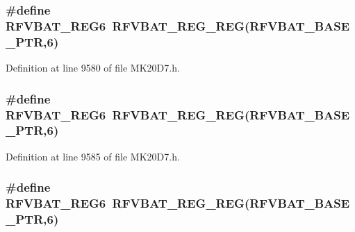 \subsubsection[{\texorpdfstring{R\+F\+V\+B\+A\+T\+\_\+\+R\+E\+G6}{RFVBAT_REG6}}]{\setlength{\rightskip}{0pt plus 5cm}\#define R\+F\+V\+B\+A\+T\+\_\+\+R\+E\+G6~{\bf R\+F\+V\+B\+A\+T\+\_\+\+R\+E\+G\+\_\+\+R\+EG}({\bf R\+F\+V\+B\+A\+T\+\_\+\+B\+A\+S\+E\+\_\+\+P\+TR},6)}\hypertarget{group___r_f_v_b_a_t___register___accessor___macros_ga8f932612a87a5a7e302b4990c3880b03}{}\label{group___r_f_v_b_a_t___register___accessor___macros_ga8f932612a87a5a7e302b4990c3880b03}


Definition at line 9580 of file M\+K20\+D7.\+h.

\subsubsection[{\texorpdfstring{R\+F\+V\+B\+A\+T\+\_\+\+R\+E\+G6}{RFVBAT_REG6}}]{\setlength{\rightskip}{0pt plus 5cm}\#define R\+F\+V\+B\+A\+T\+\_\+\+R\+E\+G6~{\bf R\+F\+V\+B\+A\+T\+\_\+\+R\+E\+G\+\_\+\+R\+EG}({\bf R\+F\+V\+B\+A\+T\+\_\+\+B\+A\+S\+E\+\_\+\+P\+TR},6)}\hypertarget{group___r_f_v_b_a_t___register___accessor___macros_ga8f932612a87a5a7e302b4990c3880b03}{}\label{group___r_f_v_b_a_t___register___accessor___macros_ga8f932612a87a5a7e302b4990c3880b03}


Definition at line 9585 of file M\+K20\+D7.\+h.

\subsubsection[{\texorpdfstring{R\+F\+V\+B\+A\+T\+\_\+\+R\+E\+G6}{RFVBAT_REG6}}]{\setlength{\rightskip}{0pt plus 5cm}\#define R\+F\+V\+B\+A\+T\+\_\+\+R\+E\+G6~{\bf R\+F\+V\+B\+A\+T\+\_\+\+R\+E\+G\+\_\+\+R\+EG}({\bf R\+F\+V\+B\+A\+T\+\_\+\+B\+A\+S\+E\+\_\+\+P\+TR},6)}\hypertarget{group___r_f_v_b_a_t___register___accessor___macros_ga8f932612a87a5a7e302b4990c3880b03}{}\label{group___r_f_v_b_a_t___register___accessor___macros_ga8f932612a87a5a7e302b4990c3880b03}


